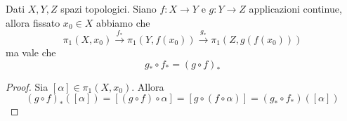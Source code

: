     \begin{theorem}\label{thm:funt_p1}
        Dati \(X,Y,Z\) spazi topologici. Siano \(f : X \to Y\) e \(g : Y \to Z\)
        applicazioni continue, allora fissato \(x_{0} \in X\) abbiamo che
        \[
          \pi_{1}{(X, x_{0})} \overset{f_*}{\to} \pi_{1}{(Y, f{(x_{0})})}
          \overset{g_*}{\to} \pi_{1}{(Z, g{(f{(x_{0})})})}
        \]
        ma vale che 
        \[
          g_* \circ f_* = (g \circ f)_*
        \]
    \end{theorem}
    \begin{proof}
        Sia \([\alpha] \in \pi_{1}{(X, x_{0})}\). Allora
        \[{(g \circ f)}_*{([\alpha])} = [{(g \circ f)} \circ \alpha] = [g \circ
        {(f \circ \alpha)}] = {(g_* \circ f_*)}{([\alpha])}\]
    \end{proof}
    
